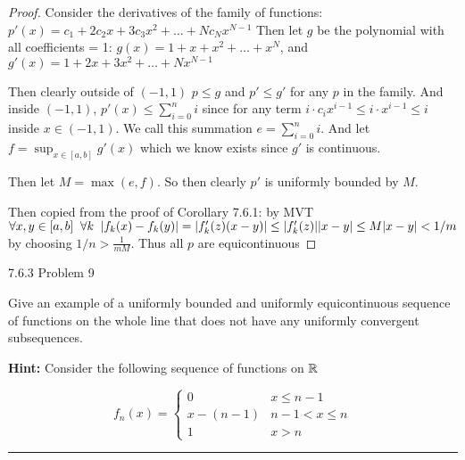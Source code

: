\documentclass[11pt]{article}
\begin{document}
\begin{proof}
    
Consider the derivatives of the family of functions:
$p'(x) = c_1 + 2 c_2 x + 3 c_3 x^2 + \dots + N c_{N} x ^{N-1}$
Then let $g$ be the polynomial with all coefficients = 1:
$g(x) = 1 + x + x^2 + \dots + x^N$, and $g'(x) = 1 + 2x + 3x^2 + \dots + N x^{N-1}$

Then clearly outside of $(-1,1)$ $p \leq g$ and $p' \leq g'$ for any $p$ in the family.
And inside $(-1, 1)$, $p'(x) \leq \sum_{i = 0} ^n i$ since for any term
$i \cdot c_i x^{i-1} \leq i \cdot x^{i-1} \leq i$ inside $x \in (-1,1)$.
We call this summation $e = \sum_{i = 0} ^n i$. And let $f = \sup_{x \in [a,b]} g'(x)$
which we know exists since $g'$ is continuous.

Then let $M = \max (e, f)$. So then clearly $p'$ is uniformly bounded by $M$.

Then copied from the proof of Corollary 7.6.1: by MVT
$\forall x, y \in [a,b] \sp \forall k \sp |f_k(x) - f_k(y)| = |f'_k(z)(x-y)| \leq |f'_k(z)||x-y| \leq M|x-y| < 1/m$
by choosing $1/n > \frac{1}{mM}$.
Thus all $p$ are equicontinuous
\end{proof}


 7.6.3 Problem 9

Give an example of a uniformly bounded and uniformly equicontinuous
sequence of functions on the whole line that does not have any uniformly
convergent subsequences.

\textbf{Hint: } Consider the following sequence of functions on $\reals$

$$f_n(x) = \begin{cases}
    0 & x \leq n-1\\
    x - (n-1) & n-1 < x \leq n\\
    1 & x > n
\end{cases}$$

\hrule
\end{document}
